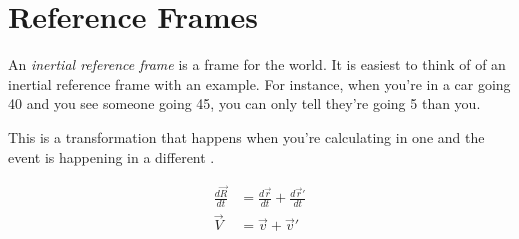 \section{Reference Frames} \label{sec:Reference Frames}
\begin{definition} \label{def:Reference Frames}
  An \emph{inertial reference frame} is a frame for the world.
  It is easiest to think of of an inertial reference frame with an example.
  For instance, when you're in a car going 40 \si{\mph} and you see someone going 45, you can only tell they're going 5 \si{\mph} than you.
\end{definition}

\begin{definition} \label{def:Galileo Transformation}
  This is a transformation that happens when you're calculating in one  and the event is happening in a different .

  \begin{equation} \label{eq:Galileo Transformation}
    \begin{aligned}
      \frac{d \vec{R}}{dt} &= \frac{d \vec{r}}{dt} + \frac{d \vec{r}'}{dt} \\
      \vec{V} &= \vec{v} + \vec{v}'
    \end{aligned}
  \end{equation}
\end{definition}
